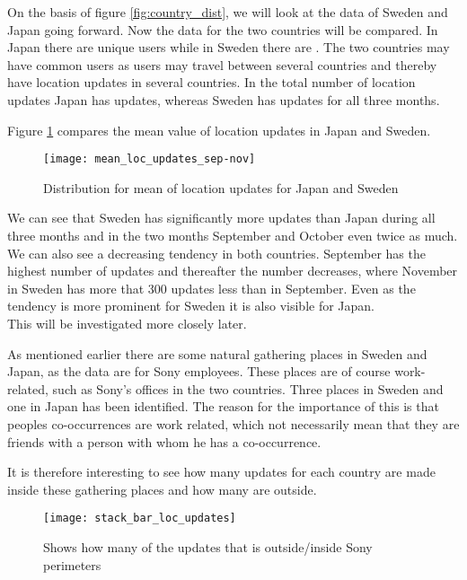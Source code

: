 On the basis of figure \ref{fig:country_dist}, we will look at the data of Sweden and Japan going forward. Now the data for the two countries will be compared. 
In Japan there are \numberUsersJapan{} unique users while in Sweden there are \numberUsersSweden{}. The two countries may have common users as users may travel between several countries and thereby have location updates in several countries.  
In the total number of location updates Japan has \locUpdatesJapan{} updates, whereas Sweden has \locUpdatesSweden{} updates for all three months. 

Figure \ref{fig:mean_loc_updates_sep-nov} compares the mean value of location updates in Japan and Sweden. 

\begin{figure}[H]
    \hspace*{-2.2cm}
    \centering
    \texttt{[image: mean\_loc\_updates\_sep-nov]}
    \caption{Distribution for mean of location updates for Japan and Sweden}
    \label{fig:mean_loc_updates_sep-nov}
\end{figure}


We can see that Sweden has significantly more updates than Japan during all three months and in the two months September and October even twice as much. We can also see a decreasing tendency in both countries. September has the highest number of updates and thereafter the number decreases, where November in Sweden has more that 300 updates less than in September. Even as the tendency is more prominent for Sweden it is also visible for Japan.  \\
This will be investigated more closely later.  


As mentioned earlier there are some natural gathering places in Sweden and Japan, as the data are for Sony employees. These places are of course work-related, such as Sony's offices in the two countries. Three places in Sweden and one in Japan has been identified. The reason for the importance of this is that peoples co-occurrences are work related, which not necessarily mean that they are friends with a person with whom he has a co-occurrence. 

It is therefore interesting to see how many updates for each country are made inside these gathering places and how many are outside.  

\begin{figure}[H]
    \hspace*{-2.2cm}
    \centering
    \texttt{[image: stack\_bar\_loc\_updates]}
    \caption{Shows how many of the updates that is outside/inside Sony perimeters}
    \label{fig:hq_stack_bar}
\end{figure}

